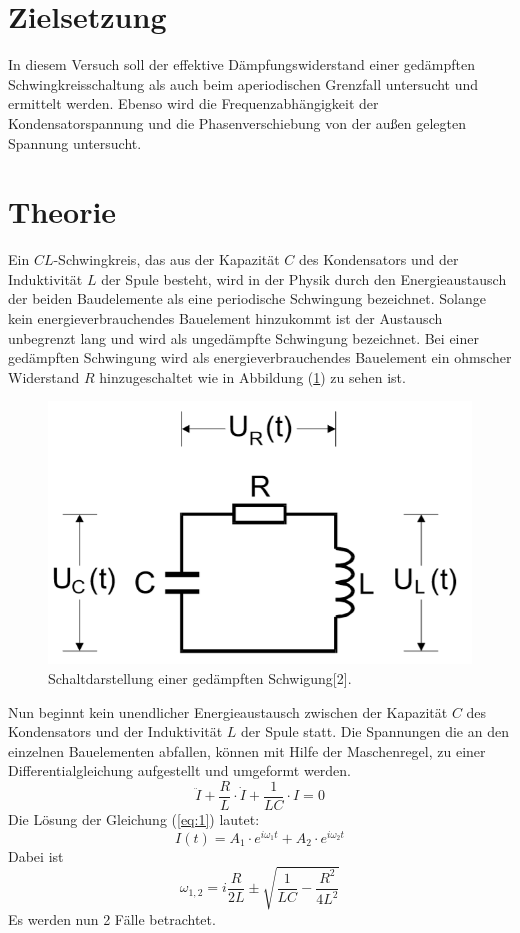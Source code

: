 \section{Zielsetzung}
In diesem Versuch soll der effektive Dämpfungswiderstand
einer gedämpften Schwingkreisschaltung als auch beim aperiodischen Grenzfall
untersucht und ermittelt werden. Ebenso wird die Frequenzabhängigkeit
der Kondensatorspannung und die Phasenverschiebung von der außen gelegten Spannung
untersucht.
\section{Theorie}
Ein $CL$-Schwingkreis, das aus der Kapazität $C$ des Kondensators und der
Induktivität $L$ der Spule besteht, wird in der Physik durch den
Energieaustausch der beiden Baudelemente als eine periodische Schwingung bezeichnet.
Solange kein energieverbrauchendes Bauelement hinzukommt ist der Austausch unbegrenzt lang
und wird als ungedämpfte Schwingung bezeichnet.
Bei einer gedämpften Schwingung wird als energieverbrauchendes Bauelement ein ohmscher Widerstand $R$
hinzugeschaltet wie in Abbildung (\ref{fig:1}) zu sehen ist.
\begin{figure}[H]
\centering
\includegraphics[width=10 cm , height=7 cm]{Schwingkreis.png}
\caption{Schaltdarstellung einer gedämpften Schwigung[2].}
\label{fig:1}
\end{figure}
Nun beginnt kein unendlicher Energieaustausch zwischen der Kapazität $C$
des Kondensators und der Induktivität $L$ der Spule statt.
Die Spannungen die an den einzelnen Bauelementen abfallen,
können mit Hilfe der Maschenregel, zu einer Differentialgleichung aufgestellt und umgeformt werden.
\begin{equation}
  \ddot{I} + \frac{R}{L} \cdot \dot{I} +\frac{1}{LC}\cdot I = 0
  \label{eq:1}
\end{equation}
Die Lösung der Gleichung (\ref{eq:1}) lautet:
\begin{equation}
  I(t) = A_1 \cdot e^{i\omega_1 t} + A_2 \cdot e^{i\omega_2 t}
  \label{eq:2}
\end{equation}
Dabei ist
\begin{equation*}
  \omega_{1,2} =  i \frac{R}{2L} \pm \sqrt{\frac{1}{LC} - \frac{R^2}{4L^2}}
\end{equation*}
Es werden nun 2 Fälle betrachtet.\\

